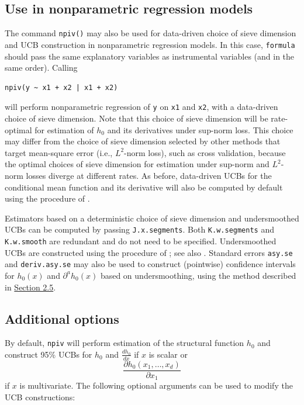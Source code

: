 \documentclass[
]{jss}
\begin{document}
\subsection{Use in nonparametric regression
models}\label{use-in-nonparametric-regression-models}

The command \texttt{npiv()} may also be used for data-driven choice of
sieve dimension and UCB construction in nonparametric regression models.
In this case, \texttt{formula} should pass the same explanatory
variables as instrumental variables (and in the same order). Calling

\begin{verbatim}
npiv(y ~ x1 + x2 | x1 + x2)
\end{verbatim}

will perform nonparametric regression of \texttt{y} on \texttt{x1} and
\texttt{x2}, with a data-driven choice of sieve dimension. Note that
this choice of sieve dimension will be rate-optimal for estimation of
\(h_0\) and its derivatives under sup-norm loss. This choice may differ
from the choice of sieve dimension selected by other methods that target
mean-square error (i.e., \(L^2\)-norm loss), such as cross validation,
because the optimal choices of sieve dimension for estimation under
sup-norm and \(L^2\)-norm losses diverge at different rates. As before,
data-driven UCBs for the conditional mean function and its derivative
will also be computed by default using the procedure of \citet{CCK}.

Estimators based on a deterministic choice of sieve dimension and
undersmoothed UCBs can be computed by passing \texttt{J.x.segments}.
Both \texttt{K.w.segments} and \texttt{K.w.smooth} are redundant and do
not need to be specified. Undersmoothed UCBs are constructed using the
procedure of \citet{CCQE}; see also \citet{BCCK}. Standard errors
\texttt{asy.se} and \texttt{deriv.asy.se} may also be used to construct
(pointwise) confidence intervals for \(h_0(x)\) and
\(\partial^a h_0(x)\) based on undersmoothing, using the method
described in \hyperref[pw]{Section 2.5}.

\newpage

\subsection{Additional options}\label{additional-options}

By default, \texttt{npiv} will perform estimation of the structural
function \(h_0\) and construct 95\% UCBs for \(h_0\) and
\(\frac{d h_0}{dx}\) if \(x\) is scalar or \[
 \frac{\partial h_0(x_1,\ldots,x_d)}{\partial x_1}
\] if \(x\) is multivariate. The following optional arguments can be
used to modify the UCB constructions:
\end{document}
